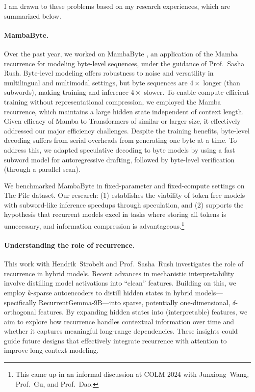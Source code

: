 I am drawn to these problems based on my research experiences, which are summarized below.

\paragraph{MambaByte.}

Over the past year, we worked on MambaByte \citep{wang_mambabyte_2024}, an application of the Mamba recurrence \citep{gu_mamba_2024} for modeling byte-level sequences, under the guidance of Prof.~Sasha Rush.
%
Byte-level modeling offers robustness to noise and versatility in multilingual and multimodal settings, but byte sequences are $4\times$ longer (than subwords), making training and inference $4\times$ slower.
%
To enable compute-efficient training without representational compression, we employed the Mamba recurrence, which maintains a large hidden state independent of context length.
%
Given efficacy of Mamba to Transformers of similar or larger size, it effectively addressed our major efficiency challenges.
%
Despite the training benefits, byte-level decoding suffers from serial overheads from generating one byte at a time.
%
To address this, we adapted speculative decoding \citep{leviathan_fast_2023} to byte models by using a fast subword model for autoregressive drafting, followed by byte-level verification (through a parallel scan).

We benchmarked MambaByte in fixed-parameter and fixed-compute settings on The Pile dataset.
%
Our research: (1) establishes the viability of token-free models with subword-like inference speedups through speculation, and (2) supports the hypothesis that recurrent models excel in tasks where storing all tokens is unnecessary, and information compression is advantageous.\footnote{This came up in an informal discussion at COLM 2024 with Junxiong~Wang, Prof.~Gu, and Prof.~Dao.}


\paragraph{Understanding the role of recurrence.}

This work with Hendrik~Strobelt and Prof.~Sasha~Rush investigates the role of recurrence in hybrid models.
%
Recent advances in mechanistic interpretability involve distilling model activations into ``clean'' features.
%
Building on this, we employ $k$-sparse autoencoders to distill hidden states in hybrid models---specifically RecurrentGemma-9B---into sparse, potentially one-dimensional, $\delta$-orthogonal features.
%
By expanding hidden states into (interpretable) features, we aim to explore how recurrence handles contextual information over time and whether it captures meaningful long-range dependencies.
% 
These insights could guide future designs that effectively integrate recurrence with attention to improve long-context modeling.

